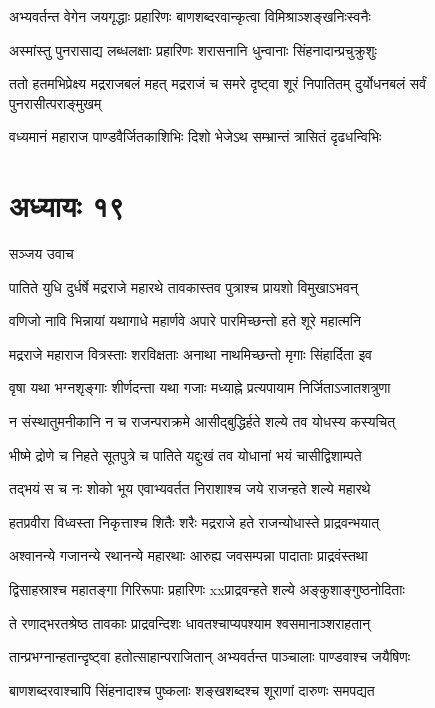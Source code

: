 \twolineshloka
{अभ्यवर्तन्त वेगेन जयगृद्धाः प्रहारिणः}
{बाणशब्दरवान्कृत्वा विमिश्राञ्शङ्खनिःस्वनैः}


\twolineshloka
{अस्मांस्तु पुनरासाद्य लब्धलक्षाः प्रहारिणः}
{शरासनानि धुन्वानाः सिंहनादान्प्रचुक्रुशुः}


\threelineshloka
{ततो हतमभिप्रेक्ष्य मद्रराजबलं महत्}
{मद्रराजं च समरे दृष्ट्वा शूरं निपातितम्}
{दुर्योधनबलं सर्वं पुनरासीत्पराङ्मुखम्}


\twolineshloka
{वध्यमानं महाराज पाण्डवैर्जितकाशिभिः}
{दिशो भेजेऽथ सम्भ्रान्तं त्रासितं दृढधन्विभिः}


\chapter{अध्यायः १९}
\twolineshloka
{सञ्जय उवाच}
{}


\twolineshloka
{पातिते युधि दुर्धर्षे मद्रराजे महारथे}
{तावकास्तव पुत्राश्च प्रायशो विमुखाऽभवन्}


\twolineshloka
{वणिजो नावि भिन्नायां यथागाधे महार्णवे}
{अपारे पारमिच्छन्तो हते शूरे महात्मनि}


\twolineshloka
{मद्रराजे महाराज वित्रस्ताः शरविक्षताः}
{अनाथा नाथमिच्छन्तो मृगाः सिंहार्दिता इव}


\twolineshloka
{वृषा यथा भग्नशृङ्गाः शीर्णदन्ता यथा गजाः}
{मध्याह्ने प्रत्यपायाम निर्जिताऽजातशत्रुणा}


\twolineshloka
{न संस्थातुमनीकानि न च राजन्पराक्रमे}
{आसीद्बुद्धिर्हते शल्ये तव योधस्य कस्यचित्}


\twolineshloka
{भीष्मे द्रोणे च निहते सूतपुत्रे च पातिते}
{यद्दुःखं तव योधानां भयं चासीद्विशाम्पते}


\twolineshloka
{तद्भयं स च नः शोको भूय एवाभ्यवर्तत}
{निराशाश्च जये राजन्हते शल्ये महारथे}


\twolineshloka
{हतप्रवीरा विध्वस्ता निकृत्ताश्च शितैः शरैः}
{मद्रराजे हते राजन्योधास्ते प्राद्रवन्भयात्}


\twolineshloka
{अश्वानन्ये गजानन्ये रथानन्ये महारथाः}
{आरुह्य जवसम्पन्ना पादाताः प्राद्रवंस्तथा}


\twolineshloka
{द्विसाहस्राश्च महातङ्गा गिरिरूपाः प्रहारिणः}
{xxप्राद्रवन्हते शल्ये अङ्कुशाङ्गुष्ठनोदिताः}


\twolineshloka
{ते रणाद्भरतश्रेष्ठ तावकाः प्राद्रवन्दिशः}
{धावतश्चाप्यपश्याम श्वसमानाञ्शराहतान्}


\twolineshloka
{तान्प्रभग्नान्हतान्दृष्ट्वा हतोत्साहान्पराजितान्}
{अभ्यवर्तन्त पाञ्चालाः पाण्डवाश्च जयैषिणः}


\twolineshloka
{बाणशब्दरवाश्चापि सिंहनादाश्च पुष्कलाः}
{शङ्खशब्दश्च शूराणां दारुणः समपद्यत}



